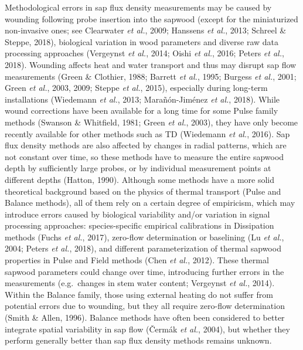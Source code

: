 \documentclass[11pt,twoside]{reedthesis}
\begin{document}
Methodological errors in sap flux density measurements may be caused by
wounding following probe insertion into the sapwood (except for the
miniaturized non-invasive ones; see Clearwater \emph{et al.}, 2009;
Hanssens \emph{et al.}, 2013; Schreel \& Steppe, 2018), biological
variation in wood parameters and diverse raw data processing approaches
(Vergeynst \emph{et al.}, 2014; Oishi \emph{et al.}, 2016; Peters
\emph{et al.}, 2018). Wounding affects heat and water transport and thus
may disrupt sap flow measurements (Green \& Clothier, 1988; Barrett
\emph{et al.}, 1995; Burgess \emph{et al.}, 2001; Green \emph{et al.},
2003, 2009; Steppe \emph{et al.}, 2015), especially during long-term
installations (Wiedemann \emph{et al.}, 2013; Marañón-Jiménez \emph{et
al.}, 2018). While wound corrections have been available for a long time
for some Pulse family methods (Swanson \& Whitfield, 1981; Green
\emph{et al.}, 2003), they have only become recently available for other
methods such as TD (Wiedemann \emph{et al.}, 2016). Sap flux density
methods are also affected by changes in radial patterns, which are not
constant over time, so these methods have to measure the entire sapwood
depth by sufficiently large probes, or by individual measurement points
at different depths (Hatton, 1990). Although some methods have a more
solid theoretical background based on the physics of thermal transport
(Pulse and Balance methods), all of them rely on a certain degree of
empiricism, which may introduce errors caused by biological variability
and/or variation in signal processing approaches: species-specific
empirical calibrations in Dissipation methods (Fuchs \emph{et al.},
2017), zero-flow determination or baselining (Lu \emph{et al.}, 2004;
Peters \emph{et al.}, 2018), and different parameterization of thermal
sapwood properties in Pulse and Field methods (Chen \emph{et al.},
2012). These thermal sapwood parameters could change over time,
introducing further errors in the measurements (e.g.~changes in stem
water content; Vergeynst \emph{et al.}, 2014). Within the Balance
family, those using external heating do not suffer from potential errors
due to wounding, but they all require zero-flow determination (Smith \&
Allen, 1996). Balance methods have often been considered to better
integrate spatial variability in sap flow (Čermák \emph{et al.}, 2004),
but whether they perform generally better than sap flux density methods
remains unknown.\par
\end{document}
